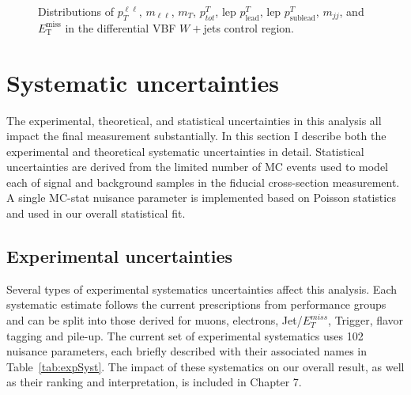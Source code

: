 \begin{figure}[!h]
  \hfill
{\caption{Distributions of $p_T^{\ell\ell}$, $m_{\ell\ell}$, $m_T$, $p^T_{tot}$, lep $p^T_{\text{lead}}$, lep $p^T_{\text{sublead}}$, $m_{jj}$, and $\ensuremath{E_{\text{T}}^{\text{miss}}}$ in the differential VBF $W+$jets control region.
\label{fig:WCR}}}
\end{figure}  

\section{Systematic uncertainties}
The experimental, theoretical, and statistical uncertainties in this analysis all impact the final measurement substantially. In this section I describe both the experimental and theoretical systematic uncertainties in detail. Statistical uncertainties are derived from the limited number of MC events used to model each of signal and background samples in the fiducial cross-section measurement. A single MC-stat nuisance parameter is implemented based on Poisson statistics and used in our overall statistical fit. 

\subsection{Experimental uncertainties}
Several types of experimental systematics uncertainties affect this analysis. Each systematic estimate follows the current prescriptions from performance groups and can be split into those derived for muons, electrons, Jet/$E_T^{miss}$, Trigger, flavor tagging and pile-up. The current set of experimental systematics uses 102 nuisance parameters, each briefly described with their associated names in Table~\ref{tab:expSyst}. The impact of these systematics on our overall result, as well as their ranking and interpretation, is included in Chapter 7. 
 
